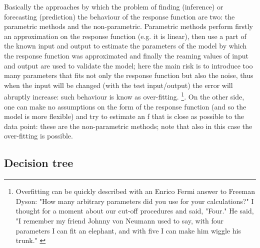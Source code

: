 \documentclass[
12pt, %
a4paper, %
oneside, %
headinclude,footinclude, %
BCOR5mm, %
]{scrartcl}
\begin{document}
Basically the approaches by which the problem of finding (inference) or forecasting (prediction) the behaviour of the response function are two: the parametric methods and the non-parametric. Parametric methods perform firstly an approximation on the response function (e.g. it is linear), then use a part of the known input and output to estimate the parameters of the model by which the response function was approximated and finally the reaming values of input and output are used to validate the model; here the main risk is to introduce too many parameters that fits not only the response function but also the noise, thus when the input will be changed (with the test input/output) the error will abruptly increase: such behaviour is know as over-fitting. \footnote{Overfitting can be quickly described with an Enrico Fermi answer to Freeman Dyson: "How many arbitrary parameters did you use for your calculations?" I thought for a moment about our cut-off procedures and said, "Four." He said, "I remember my friend Johnny von Neumann used to say, with four parameters I can fit an elephant, and with five I can make him wiggle his trunk." \cite{dyson}}. On the other side, one can make no assumptions on the form of the response function (and so the model is more flexible) and try to estimate an f that is close as possible to the data point: these are the non-parametric methods; note that also in this case the over-fitting is possible. 


\clearpage

\subsection{Decision tree}
\end{document}
